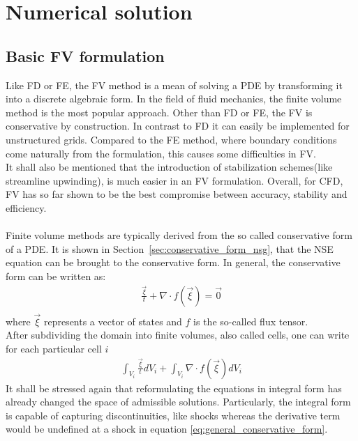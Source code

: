 \documentclass[../main.tex]{subfiles}
\begin{document}
\setlength{\delimitershortfall}{0pt}

\section{Numerical solution}\label{sec:finite_volume_method}
\subsection{Basic \acf{FV} formulation}
Like \ac{FD} or \acf{FE}, the \acf{FV} method is a mean of solving a \ac{PDE} by transforming it into a discrete algebraic form. In the field of fluid mechanics, the finite volume method is the most popular approach. Other than \ac{FD} or \ac{FE}, the \ac{FV} is conservative by construction. In contrast to \ac{FD} it can easily be implemented for unstructured grids. Compared to the \ac{FE} method, where boundary conditions come naturally from the formulation, this causes some difficulties in \ac{FV}.\\
It shall also be mentioned that the introduction of stabilization schemes(like streamline upwinding), is much easier in an \ac{FV} formulation.
Overall, for \ac{CFD}, \ac{FV} has so far shown to be the best compromise between accuracy, stability and efficiency.
 \\
 \\
Finite volume methods are typically derived from the so called conservative form of a \ac{PDE}. It is shown in Section~\ref{sec:conservative_form_nsg}, that the \ac{NSE} equation can be  brought to the conservative form. In general, the conservative form can be written as:
\begin{align}\label{eq:general_conservative_form}
\tfrac{\vec{\xi}}{t}+\nabla\cdot f(\vec{\xi}) = \vec{0} \\
\end{align}
where $\vec{\xi}$ represents a vector of states and $f$ is the so-called flux tensor.\\
After subdividing the domain into finite volumes, also called cells, one can write for each particular cell $i$
\begin{align}
\int_{V_i} \tfrac{\vec{\xi}}{t} dV_i + \int_{V_i} \nabla\cdot f(\vec{\xi}) dV_i
\end{align}
It shall be stressed again that reformulating the equations in integral form has already changed the space of admissible solutions. Particularly, the integral form is capable of capturing discontinuities, like shocks whereas the derivative term would be undefined  at a shock in equation \eqref{eq:general_conservative_form}.
\end{document}
